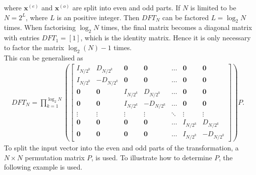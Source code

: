 where $\mathbf{x}^{(e)}$ and $\mathbf{x}^{(o)}$ are split into even and odd parts.  
If $N$ is limited to be $N=2^L$, where $L$ is an positive integer. Then $DFT_N$ can be factored $L=\log_2 N$ times. When factorising $\log_2 N$ times, the final matrix becomes a diagonal matrix with entries $DFT_1=[1]$, which is the identity matrix. Hence it is only necessary to factor the matrix $\log_2(N) - 1$ times. \cite[68-69]{ryan2019linear}\\
This can be generalised as
\begin{align*}
    DFT_N=\prod_{k=1}^{\log_2 N}\left(
    \begin{bmatrix}
    I_{N/2^k}  & D_{N/2^k}  & \mathbf{0} & \mathbf{0} & \hdots & \mathbf{0} & \mathbf{0}\\
    I_{N/2^k}  & -D_{N/2^k} & \mathbf{0} & \mathbf{0} & \hdots & \mathbf{0} & \mathbf{0}\\
    \mathbf{0} & \mathbf{0} & I_{N/2^k}  & D_{N/2^k}  & \hdots & \mathbf{0} & \mathbf{0}\\
    \mathbf{0} & \mathbf{0} & I_{N/2^k}  & -D_{N/2^k} & \hdots & \mathbf{0} & \mathbf{0}\\
    \vdots     & \vdots     & \vdots     & \vdots     & \ddots & \vdots     & \vdots    \\
    \mathbf{0} & \mathbf{0} & \mathbf{0} & \mathbf{0} & \hdots & I_{N/2^k}  & D_{N/2^k} \\
    \mathbf{0} & \mathbf{0} & \mathbf{0} & \mathbf{0} & \hdots & I_{N/2^k}  & -D_{N/2^k}
    \end{bmatrix}
    \right)P.
\end{align*}
To split the input vector into the even and odd parts of the transformation, a $N\times N$ permutation matrix $P$, is used. To illustrate how to determine $P$, the following example is used. 

